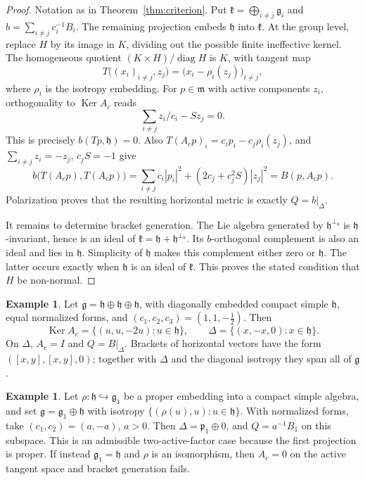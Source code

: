 \documentclass[12pt]{amsart}
\theoremstyle{plain}
\theoremstyle{definition}
\newtheorem{example}[theorem]{Example}
\theoremstyle{remark}
\newcommand{\alg}[1]{\mathfrak{#1}}
\newcommand{\Ker}{\operatorname{Ker}}
\newcommand{\diag}{\operatorname{diag}}
\begin{document}
\begin{proof}
Notation as in Theorem~\ref{thm:criterion}. Put $\alg{k}=\bigoplus_{i\neq j}\alg{g}_i$ and
$b=\sum_{i\neq j}c_i^{-1}B_i$. The remaining projection embeds $\alg{h}$ into $\alg{k}$. At the
group level, replace $H$ by its image in $K$, dividing out the possible finite ineffective kernel.
The homogeneous quotient $(K\times H)/\diag H$ is $K$, with tangent map
\[ T\big((x_i)_{i\neq j},z_j\big)=\big(x_i-\rho_i(z_j)\big)_{i\neq j}, \]
where $\rho_i$ is the isotropy embedding. For $p\in\alg{m}$ with active
components $z_i$, orthogonality to $\Ker A_c$ reads
\[ \sum_{i\neq j}z_i/c_i-Sz_j=0. \]
This is precisely $b(Tp,\alg{h})=0$. Also $T(A_cp)_i=c_ip_i-c_j\rho_i(z_j)$, and
$\sum_{i\neq j}z_i=-z_j$, $c_jS=-1$ give
\[ b\big(T(A_cp),T(A_cp)\big)=\sum_{i\neq j}c_i|p_i|^2+(2c_j+c_j^2S)|z_j|^2=B(p,A_cp). \]
Polarization proves that the resulting horizontal metric is exactly $Q=b|_{\Delta}$.

It remains to determine bracket generation. The Lie algebra generated by $\alg{h}^{\perp_b}$ is
$\alg{h}$-invariant, hence is an ideal of $\alg{k}=\alg{h}+\alg{h}^{\perp_b}$. Its
$b$-orthogonal complement is also an ideal and lies in $\alg{h}$. Simplicity of $\alg{h}$ makes
this complement either zero or $\alg{h}$. The latter occurs exactly when $\alg{h}$ is an ideal of
$\alg{k}$. This proves the stated condition that $H$ be non-normal.
\end{proof}


\begin{example}\label{ex:three}
Let $\alg{g}=\alg{h}\oplus\alg{h}\oplus\alg{h}$, with diagonally embedded compact simple $\alg{h}$,
equal normalized forms, and $(c_1,c_2,c_3)=(1,1,-\tfrac12)$. Then
\[ \Ker A_c=\{(u,u,-2u):u\in\alg{h}\},\qquad \Delta=\{(x,-x,0):x\in\alg{h}\}. \]
On $\Delta$, $A_c=I$ and $Q=B|_{\Delta}$. Brackets of horizontal vectors have the form
$([x,y],[x,y],0)$; together with $\Delta$ and the diagonal isotropy they span all of $\alg{g}$.
\end{example}

\begin{example}\label{ex:two}
Let $\rho:\alg{h}\hookrightarrow\alg{g}_1$ be a proper embedding into a compact simple algebra,
and set $\alg{g}=\alg{g}_1\oplus\alg{h}$ with isotropy $\{(\rho(u),u):u\in\alg{h}\}$. With
normalized forms, take $(c_1,c_2)=(a,-a)$, $a>0$. Then $\Delta=\alg{p}_1\oplus0$, and
$Q=a^{-1}B_1$ on this subspace. This is an admissible two-active-factor case because the first
projection is proper. If instead $\alg{g}_1=\alg{h}$ and $\rho$ is an isomorphism, then $A_c=0$ on
the active tangent space and bracket generation fails.
\end{example}
\end{document}
